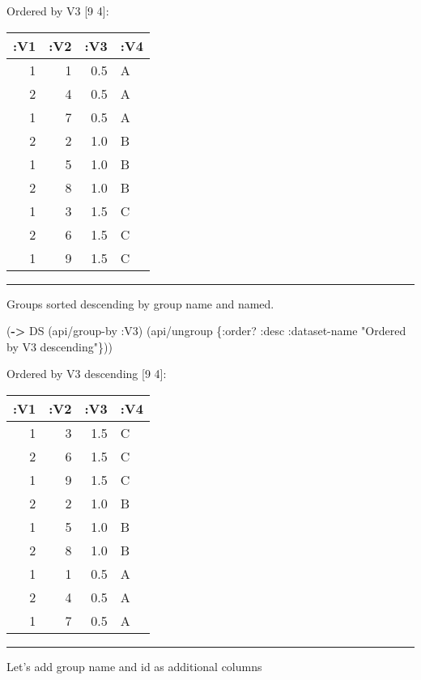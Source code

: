 \documentclass[]{article}
\newenvironment{Shaded}{\begin{snugshade}}{\end{snugshade}}
\newcommand{\KeywordTok}[1]{\textcolor[rgb]{0.13,0.29,0.53}{\textbf{#1}}}
\newcommand{\DecValTok}[1]{\textcolor[rgb]{0.00,0.00,0.81}{#1}}
\newcommand{\StringTok}[1]{\textcolor[rgb]{0.31,0.60,0.02}{#1}}
\newcommand{\VariableTok}[1]{\textcolor[rgb]{0.00,0.00,0.00}{#1}}
\newcommand{\AttributeTok}[1]{\textcolor[rgb]{0.77,0.63,0.00}{#1}}
\newcommand{\NormalTok}[1]{#1}
\begin{document}
Ordered by V3 {[}9 4{]}:

\begin{longtable}[]{@{}rrrl@{}}
\toprule
:V1 & :V2 & :V3 & :V4\tabularnewline
\midrule
\endhead
1 & 1 & 0.5 & A\tabularnewline
2 & 4 & 0.5 & A\tabularnewline
1 & 7 & 0.5 & A\tabularnewline
2 & 2 & 1.0 & B\tabularnewline
1 & 5 & 1.0 & B\tabularnewline
2 & 8 & 1.0 & B\tabularnewline
1 & 3 & 1.5 & C\tabularnewline
2 & 6 & 1.5 & C\tabularnewline
1 & 9 & 1.5 & C\tabularnewline
\bottomrule
\end{longtable}

\begin{center}\rule{0.5\linewidth}{0.5pt}\end{center}

Groups sorted descending by group name and named.

\begin{Shaded}
\begin{Highlighting}[]
\NormalTok{(}\KeywordTok{->}\NormalTok{ DS}
\NormalTok{    (api/group-by }\AttributeTok{:V3}\NormalTok{)}
\NormalTok{    (api/ungroup \{}\AttributeTok{:order}\NormalTok{? }\AttributeTok{:desc}
                  \AttributeTok{:dataset-name} \StringTok{"Ordered by V3 descending"}\NormalTok{\}))}
\end{Highlighting}
\end{Shaded}

Ordered by V3 descending {[}9 4{]}:

\begin{longtable}[]{@{}rrrl@{}}
\toprule
:V1 & :V2 & :V3 & :V4\tabularnewline
\midrule
\endhead
1 & 3 & 1.5 & C\tabularnewline
2 & 6 & 1.5 & C\tabularnewline
1 & 9 & 1.5 & C\tabularnewline
2 & 2 & 1.0 & B\tabularnewline
1 & 5 & 1.0 & B\tabularnewline
2 & 8 & 1.0 & B\tabularnewline
1 & 1 & 0.5 & A\tabularnewline
2 & 4 & 0.5 & A\tabularnewline
1 & 7 & 0.5 & A\tabularnewline
\bottomrule
\end{longtable}

\begin{center}\rule{0.5\linewidth}{0.5pt}\end{center}

Let's add group name and id as additional columns

\begin{Shaded}
\end{Shaded}
\end{document}
